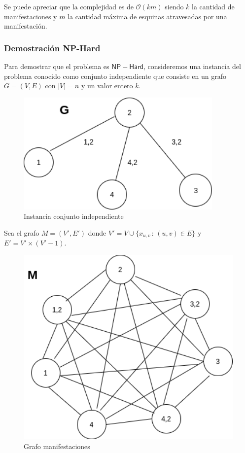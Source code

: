 Se puede apreciar que la complejidad es de $\mathcal{O}(km)$ siendo $k$ la cantidad de manifestaciones y $m$ la cantidad máxima de esquinas atravesadas por una manifestación.

\subsubsection{Demostración NP-Hard}
Para demostrar que el problema es $\mathsf{NP-Hard}$, consideremos una instancia del problema conocido como conjunto independiente que consiste en un grafo $G=(V, E)$ con $|V|=n$ y un valor entero $k$.

\begin{figure}[H]
\centering
\includegraphics[width=0.9\textwidth]{Informe/Imagenes/Parte1/grafico 1.png}
\caption{\label{fig:class01}Instancia conjunto independiente}
\end{figure}

Sea el grafo $M = (V', E')$ donde $V' = V \cup \{ x_{u,v} \, : \, (u,v) \in E \}$ y $E' = V' \times (V'-1)$.

\begin{figure}[H]
\centering
\includegraphics[width=1.135\textwidth]{Informe/Imagenes/Parte1/grafico 2.png}
\caption{\label{fig:class01}Grafo manifestaciones}
\end{figure}

